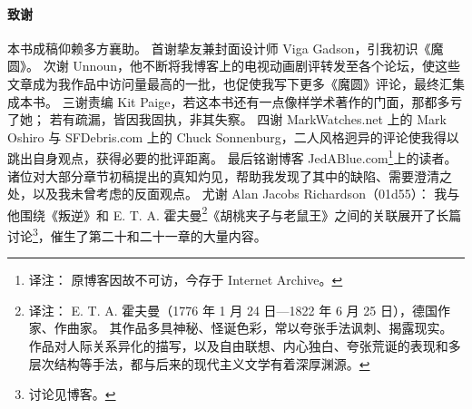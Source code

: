\paragraph{致谢}

本书成稿仰赖多方襄助。
首谢挚友兼封面设计师 Viga Gadson，引我初识《魔圆》。
次谢 Unnoun，他不断将我博客上的电视动画剧评转发至各个论坛，使这些文章成为我作品中访问量最高的一批，也促使我写下更多《魔圆》评论，最终汇集成本书。
三谢责编 Kit Paige，若这本书还有一点像样学术著作的门面，那都多亏了她；
若有疏漏，皆因我固执，非其失察。
四谢 MarkWatches.net 上的 Mark Oshiro 与 SFDebris.com 上的 Chuck Sonnenburg，二人风格迥异的评论使我得以跳出自身观点，获得必要的批评距离。
最后铭谢博客 JedABlue.com\footnote{%
    译注：
    原博客因故不可访，今存于 Internet Archive。
}上的读者。
诸位对大部分章节初稿提出的真知灼见，帮助我发现了其中的缺陷、需要澄清之处，以及我未曾考虑的反面观点。
尤谢 Alan Jacobs Richardson（01d55）：
我与他围绕《叛逆》和 E. T. A. 霍夫曼\footnote{%
    译注：
    E. T. A. 霍夫曼（1776 年 1 月 24 日—1822 年 6 月 25 日），德国作家、作曲家。
    其作品多具神秘、怪诞色彩，常以夸张手法讽刺、揭露现实。
    作品对人际关系异化的描写，以及自由联想、内心独白、夸张荒诞的表现和多层次结构等手法，都与后来的现代主义文学有着深厚渊源。
}《胡桃夹子与老鼠王》之间的关联展开了长篇讨论\footnote{%
    讨论见博客。
}\cite{blue2014nutcracker}，催生了第二十和二十一章的大量内容。
